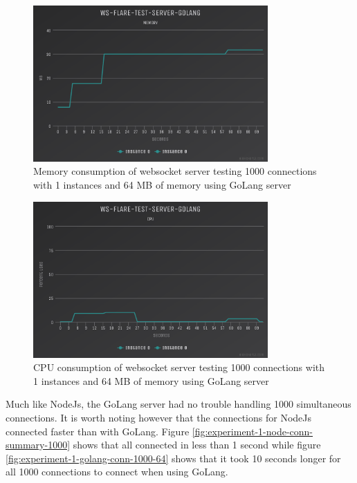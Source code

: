 \begin{figure}[H]
  \centering
    \includegraphics[width=0.8\textwidth]{figures/experiments/experiment-1/golang/memory-1000-64.png}
    \caption{Memory consumption of websocket server testing 1000 connections with 1 instances and 64 MB of memory using GoLang server}
    \label{fig:experiment-1-golang-memory-1000-64}
\end{figure}

\begin{figure}[H]
  \centering
    \includegraphics[width=0.8\textwidth]{figures/experiments/experiment-1/golang/cpu-1000-64.png}
    \caption{CPU consumption of websocket server testing 1000 connections with 1 instances and 64 MB of memory using GoLang server}
    \label{fig:experiment-1-golang-cpu-1000-64}
\end{figure}

Much like NodeJs, the GoLang server had no trouble handling 1000 simultaneous connections. It is worth noting however that the connections for NodeJs connected faster than with GoLang. Figure \ref{fig:experiment-1-node-conn-summary-1000} shows that all connected in less than 1 second while figure \ref{fig:experiment-1-golang-conn-1000-64} shows that it took 10 seconds longer for all 1000 connections to connect when using GoLang.

